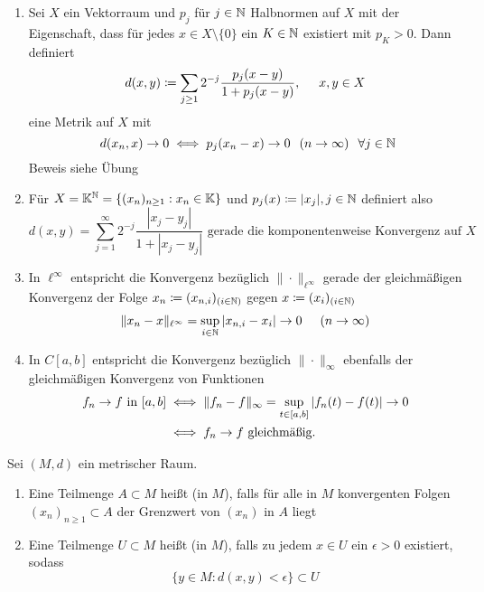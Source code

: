 \begin{beispiel}  \label{bsp:4.3}
	\begin{enumerate}[label=\alph*\upshape)]	
		\item Sei $X$ ein Vektorraum und $p_{j}$ für $j \in \mathbb{N}$ Halbnormen auf $X$ mit der Eigenschaft, dass für jedes $x \in X \setminus \{ 0 \}$ ein $K \in \mathbb{N}$ existiert mit $p_{K} > 0$. Dann definiert
			\[ d(x, y) \coloneqq \sum_{j \geq 1} 2^{-j} \frac{p_{j}(x - y)}{1 + p_{j}(x -y)}, \hspace{0.5cm} x, y \in X \]
			eine Metrik auf $X$ mit
			\[ d(x_{n}, x) \rightarrow 0 \gdw p_{j}(x_{n} - x) \rightarrow 0 \hspace{0.25cm} (n \rightarrow  \infty) \hspace{0.25cm} \forall j \in \MdN \]
			Beweis siehe Übung
		\item Für $X = \mathbb{K}^{\mathbb{N}} = \{ (x_{n})_{n \geq 1}: x_{n} \in \mathbb{K} \}$ und $p_{j}(x) \coloneqq |x_{j}|, j \in \mathbb{N}$ definiert also
			\[ d(x, y) = \sum_{j = 1}^{\infty} 2^{-j} \frac{|x_{j} - y_{j}|}{1 + |x_{j} - y_{j}|} \text{ gerade die komponentenweise Konvergenz auf } X \]
		\item In $\ell^{\infty}$ entspricht die Konvergenz bezüglich $\| \cdot \|_{\ell^{\infty}}$ gerade der gleichmä{\ss}igen Konvergenz der Folge $x_{n} \coloneqq (x_{n, i})_{(i \in \mathbb{N})}$ gegen $x \coloneqq (x_{i})_{(i \in \mathbb{N})}$
			\[ \| x_{n} - x \|_{\ell^{\infty}} = \sup_{i \in \mathbb{N}} | x_{n, i} - x_{i} | \rightarrow 0 \hspace{0.5cm} (n \rightarrow \infty) \]
		\item In $C[a, b]$ entspricht die Konvergenz bezüglich $\| \cdot \|_{\infty}$ ebenfalls der gleichmä{\ss}igen Konvergenz von Funktionen
			\begin{align*}
				f_{n} \rightarrow f \text{ in } [a, b] & \iff \| f_{n} - f \|_{\infty} = \sup_{t \in [a, b]} |f_{n}(t) - f(t) | \rightarrow 0 \\
				& \iff f_{n} \rightarrow f \text{ gleichmä{\ss}ig.}
			\end{align*}
	\end{enumerate}
\end{beispiel}


\begin{definition} \label{def:4.4-AbgeschlossenOffen}
	Sei $(M, d)$ ein metrischer Raum.
	\begin{enumerate}[label=\alph*\upshape)]
		\item Eine Teilmenge $A \subset M$ hei{\ss}t  (in $M$), falls für alle in $M$ konvergenten Folgen $(x_{n})_{n \geq 1} \subset A$ der Grenzwert von $(x_{n})$ in $A$ liegt
		\item Eine Teilmenge $U \subset M$ hei{\ss}t  (in $M$), falls zu jedem $x \in U$ ein $\epsilon > 0$ existiert, sodass
			\[ \{ y \in M: d(x, y) < \epsilon \} \subset U \]
	\end{enumerate}
\end{definition}


